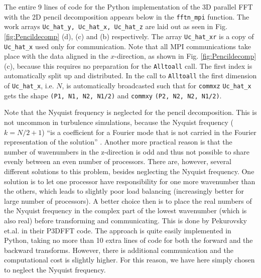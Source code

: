 \documentclass[11pt, oneside]{article}
\newcommand{\inpyth}{\lstinline[style=pythonstyle, basicstyle=\ttfamily]} %[]%
\begin{document}
The entire 9 lines of code for the Python implementation of the 3D parallel FFT with the 2D pencil 
decomposition appears below in the \inpyth{fftn_mpi} function. The work arrays \inpyth{Uc_hat_y, Uc_hat_x, Uc_hat_z} are laid out as seen in Fig. \ref{fig:Pencildecomp} (d), (c) and (b) respectively. The array 
\inpyth{Uc_hat_xr} is a copy of \inpyth{Uc_hat_x} used only for communication. Note that all MPI 
communications take place with the data aligned in the $x$-direction, as shown in Fig. 
\ref{fig:Pencildecomp} (c), because this requires no preparation for the \inpyth{Alltoall} call. The first 
index is automatically split up and distributed.  In the call to \inpyth{Alltoall} the first dimension of 
\inpyth{Uc_hat_x}, i.e. $N$, is automatically broadcasted such that for \inpyth{commxz} \inpyth{Uc_hat_x} 
gets the shape \inpyth{(P1, N1, N2, N1/2)} and \inpyth{commxy} \inpyth{(P2, N2, N2, N1/2)}.

Note that the Nyquist frequency is neglected for the pencil decomposition. This is not uncommon in 
turbulence simulations, because the Nyquist frequency ($k=N/2+1$) ``is a coefficient for a Fourier mode 
that is not carried in the Fourier representation of the solution'' \cite{Lee2013}.  Another more practical 
reason is that the number of wavenumbers in the z-direction is odd and thus not possible to share evenly 
between an even number of processors. There are, however, several different solutions to this problem, 
besides neglecting the Nyquist frequency. One solution is to let one processor have responsibility for one 
more wavenumber than the others, which leads to slightly poor load balancing (increasingly better for large 
number of processors). A better choice then is to place the real numbers of the Nyquist frequency in the 
complex part of the lowest wavenumber (which is also real) before transforming and communicating. This is 
done by Pekurovsky et.al. \cite{pekurovsky2012} in their P3DFFT code. The approach is quite easily 
implemented in Python, taking no more than 10 extra lines of code for both the forward and the backward 
transforms. However, there is additional communication and the computational cost is slightly higher. For 
this reason, we have here simply chosen to neglect the Nyquist frequency.
\end{document}
